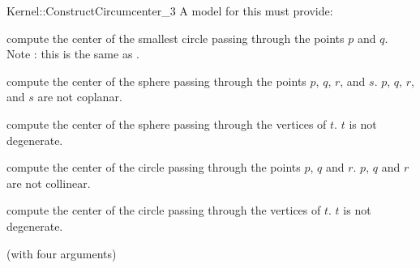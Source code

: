 \begin{ccRefFunctionObjectConcept}{Kernel::ConstructCircumcenter_3}
A model for this must provide:


 {compute the center of the smallest circle passing through the points $p$ and
  $q$.  Note : this is the same as . }

 {compute the center of the sphere passing through the points $p$, $q$, $r$,
  and $s$.  \ccPrecond $p$, $q$, $r$, and $s$ are not coplanar.}

 {compute the center of the sphere passing through the vertices of $t$.
  \ccPrecond $t$ is not degenerate.}

{compute the center of the circle passing through the points $p$, $q$ and $r$.
  \ccPrecond $p$, $q$ and $r$ are not collinear.}

 {compute the center of the circle passing through the vertices of $t$.
  \ccPrecond $t$ is not degenerate.}

\ccRefines
{} (with four arguments)

\ccSeeAlso
{} \\

\end{ccRefFunctionObjectConcept}
